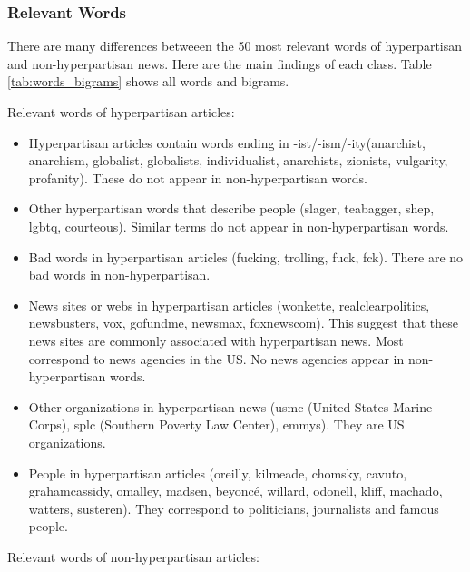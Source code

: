 \documentclass[11pt,a4paper]{article}
\begin{document}
\subsubsection{Relevant Words}

There are many differences betweeen the 50 most relevant words of
hyperpartisan and non-hyperpartisan news. Here are the main findings of each class. Table \ref{tab:words_bigrams} shows all words and bigrams.

Relevant words of hyperpartisan articles:

\begin{itemize}
\item
  Hyperpartisan articles contain words ending in
  -ist/-ism/-ity(anarchist, anarchism, globalist, globalists,
  individualist, anarchists, zionists, vulgarity, profanity). These do
  not appear in non-hyperpartisan words.
\item
  Other hyperpartisan words that describe people (slager, teabagger,
  shep, lgbtq, courteous). Similar terms do not appear in
  non-hyperpartisan words.
\item
  Bad words in hyperpartisan articles (fucking, trolling, fuck, fck).
  There are no bad words in non-hyperpartisan.
\item
  News sites or webs in hyperpartisan articles (wonkette,
  realclearpolitics, newsbusters, vox, gofundme, newsmax, foxnewscom).
  This suggest that these news sites are commonly associated with
  hyperpartisan news. Most correspond to news agencies in the US. No
  news agencies appear in non-hyperpartisan words.
\item
  Other organizations in hyperpartisan news (usmc (United States Marine
  Corps), splc (Southern Poverty Law Center), emmys). They are US
  organizations.
\item
  People in hyperpartisan articles (oreilly, kilmeade, chomsky, cavuto,
  grahamcassidy, omalley, madsen, beyoncé, willard, odonell, kliff,
  machado, watters, susteren). They correspond to politicians,
  journalists and famous people.
\end{itemize}

Relevant words of non-hyperpartisan articles:
\end{document}

